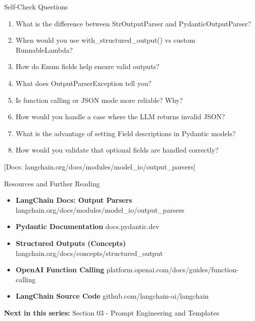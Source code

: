 \documentclass[aspectratio=169,11pt]{beamer}
\newcommand{\docref}[1]{{\scriptsize\color{docgray}[Docs: #1]}}
\begin{document}
\begin{frame}{Self-Check Questions}
\begin{enumerate}
  \item What is the difference between StrOutputParser and PydanticOutputParser?

  \item When would you use with\_structured\_output() vs custom RunnableLambda?

  \item How do Enum fields help ensure valid outputs?

  \item What does OutputParserException tell you?

  \item Is function calling or JSON mode more reliable? Why?

  \item How would you handle a case where the LLM returns invalid JSON?

  \item What is the advantage of setting Field descriptions in Pydantic models?

  \item How would you validate that optional fields are handled correctly?
\end{enumerate}

\docref{langchain.org/docs/modules/model\_io/output\_parsers}
\end{frame}

\begin{frame}{Resources and Further Reading}
\begin{itemize}
  \setlength{\itemsep}{1pt}
  \item \textbf{LangChain Docs: Output Parsers}
    langchain.org/docs/modules/model\_io/output\_parsers

  \item \textbf{Pydantic Documentation}
    docs.pydantic.dev

  \item \textbf{Structured Outputs (Concepts)}
    langchain.org/docs/concepts/structured\_output

  \item \textbf{OpenAI Function Calling}
    platform.openai.com/docs/guides/function-calling

  \item \textbf{LangChain Source Code}
    github.com/langchain-ai/langchain
\end{itemize}

\vspace{0.08cm}

\textbf{Next in this series:} Section 03 - Prompt Engineering and Templates
\end{frame}
\end{document}

